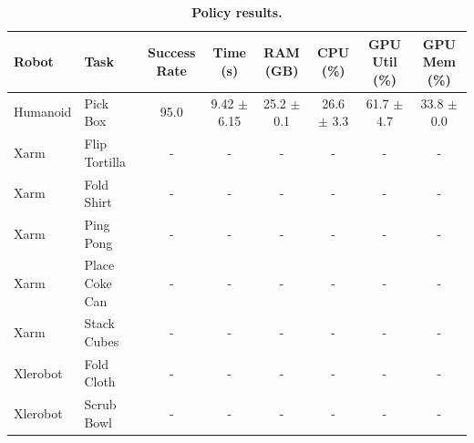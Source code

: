 \begin{table}[h]
\centering
\caption{\textbf{Policy results.} }
\label{tab:policy_results}
\begin{tabular}{l l c c c c c c}
\hline
Robot & Task & Success Rate & Time (s) & RAM (GB) & CPU (\%) & GPU Util (\%) & GPU Mem (\%) \\
\hline
Humanoid & Pick Box & 95.0 & 9.42 $\pm$ 6.15 & 25.2 $\pm$ 0.1 & 26.6 $\pm$ 3.3 & 61.7 $\pm$ 4.7 & 33.8 $\pm$ 0.0 \\
Xarm & Flip Tortilla & - & - & - & - & - & - \\
Xarm & Fold Shirt & - & - & - & - & - & - \\
Xarm & Ping Pong & - & - & - & - & - & - \\
Xarm & Place Coke Can & - & - & - & - & - & - \\
Xarm & Stack Cubes & - & - & - & - & - & - \\
Xlerobot & Fold Cloth & - & - & - & - & - & - \\
Xlerobot & Scrub Bowl & - & - & - & - & - & - \\
\hline
\end{tabular}
\end{table}